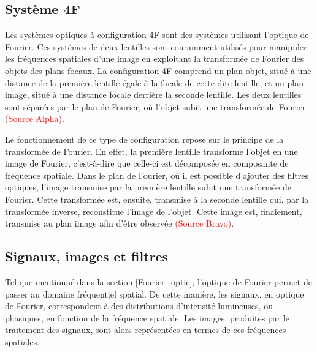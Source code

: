\documentclass[11pt,letterpaper]{article}
\begin{document}

\subsection{Système 4F}
Les systèmes optiques à configuration 4F sont des systèmes utilisant l'optique de Fourier. Ces systèmes de deux lentilles sont couramment utilisés pour manipuler les fréquences spatiales d'une image en exploitant la transformée de Fourier des objets des plans focaux. La configuration 4F comprend un plan objet, situé à une distance de la première lentille égale à la focale de cette dite lentille, et un plan image, situé à une distance focale derrière la seconde lentille. Les deux lentilles sont séparées par le plan de Fourier, où l'objet subit une transformée de Fourier \textcolor{red}{(Source Alpha)}.

Le fonctionnement de ce type de configuration repose sur le principe de la transformée de Fourier. En effet, la première lentille transforme l'objet en une image de Fourier, c'est-à-dire que celle-ci est décomposée en composante de fréquence spatiale. Dans le plan de Fourier, où il est possible d'ajouter des filtres optiques, l'image transmise par la première lentille subit une transformée de Fourier. Cette transformée est, ensuite, transmise à la seconde lentille qui, par la transformée inverse, reconstitue l'image de l'objet. Cette image est, finalement, transmise au plan image afin d'être observée \textcolor{red}{(Source Bravo)}.



\subsection{Signaux, images et filtres}
Tel que mentionné dans la section \ref{Fourier_optic}, l'optique de Fourier permet de passer au domaine fréquentiel spatial. De cette manière, les signaux, en optique de Fourier, correspondent à des distributions d'intensité lumineuses, ou phasiques, en fonction de la fréquence spatiale. Les images, produites par le traitement des signaux, sont alors représentées en termes de ces fréquences spatiales.
\end{document}
